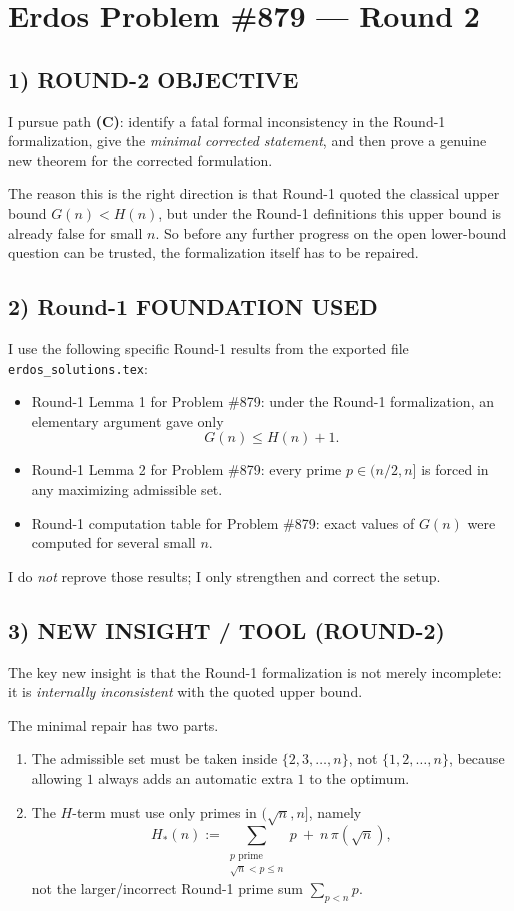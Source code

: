 \section*{Erdos Problem \#879 --- Round 2}

\subsection*{1) ROUND-2 OBJECTIVE}
I pursue path \textbf{(C)}: identify a fatal formal inconsistency in the Round-1 formalization, give the \emph{minimal corrected statement}, and then prove a genuine new theorem for the corrected formulation.

The reason this is the right direction is that Round-1 quoted the classical upper bound $G(n)<H(n)$, but under the Round-1 definitions this upper bound is already false for small $n$. So before any further progress on the open lower-bound question can be trusted, the formalization itself has to be repaired.

\subsection*{2) Round-1 FOUNDATION USED}
I use the following specific Round-1 results from the exported file \texttt{erdos\_solutions.tex}:
\begin{itemize}
\item Round-1 Lemma 1 for Problem \#879: under the Round-1 formalization, an elementary argument gave only
\[
G(n)\le H(n)+1.
\]
\item Round-1 Lemma 2 for Problem \#879: every prime $p\in(n/2,n]$ is forced in any maximizing admissible set.
\item Round-1 computation table for Problem \#879: exact values of $G(n)$ were computed for several small $n$.
\end{itemize}
I do \emph{not} reprove those results; I only strengthen and correct the setup.

\subsection*{3) NEW INSIGHT / TOOL (ROUND-2)}
The key new insight is that the Round-1 formalization is not merely incomplete: it is \emph{internally inconsistent} with the quoted upper bound.

The minimal repair has two parts.
\begin{enumerate}
\item The admissible set must be taken inside $\{2,3,\dots,n\}$, not $\{1,2,\dots,n\}$, because allowing $1$ always adds an automatic extra $1$ to the optimum.
\item The $H$-term must use only primes in $(\sqrt n,n]$, namely
\[
H_*(n):=\sum_{\substack{p\text{ prime}\\ \sqrt n<p\le n}}p\ +\ n\,\pi(\sqrt n),
\]
not the larger/incorrect Round-1 prime sum $\sum_{p<n}p$.
\end{enumerate}

